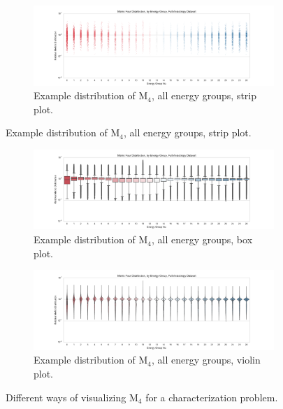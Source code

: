 \begin{figure}[htb!]
  \centering
  \begin{subfigure}[t]{\textwidth}
    \includegraphics[width=\linewidth]{./chapters/characterization_probs/figures/sample_data/metric_four_strip_full.pdf}
    \caption{Example distribution of M$_4$, all energy groups, strip plot.}
    \label{fig:samplestripM4}
  \end{subfigure}
\end{figure}
\begin{figure}[htb!]\ContinuedFloat
  \centering
  \begin{subfigure}[t]{\textwidth}
    \includegraphics[width=\linewidth]{./chapters/characterization_probs/figures/sample_data/metric_four_box_full.pdf}
    \caption{Example distribution of M$_4$, all energy groups, box plot.}
    \label{fig:sampleboxM4}
  \end{subfigure}
  \begin{subfigure}[t]{\textwidth}
    \includegraphics[width=\linewidth]{./chapters/characterization_probs/figures/sample_data/metric_four_violin_full.pdf}
    \caption{Example distribution of M$_4$, all energy groups, violin plot.}
    \label{fig:sampleviolinM4}
  \end{subfigure}
  \caption[Different ways of visualizing M$_4$ for a characterization problem.]
  {Different ways of visualizing M$_4$ for a characterization problem.}
  \label{fig:sampledistros}
\end{figure}

